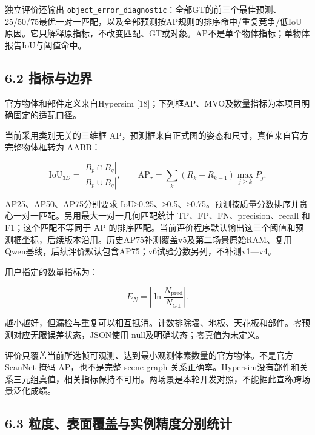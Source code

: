 \documentclass[UTF8,fontset=fandol]{ctexart}
\begin{document}
独立评价还输出 \texttt{object\_\allowbreak{}error\_\allowbreak{}diagnostic}：全部GT的前三个最佳预测、25/50/75最优一对一匹配，以及全部预测按AP规则的排序命中/重复竞争/低IoU原因。它只解释原指标，不改变匹配、GT或对象。AP不是单个物体指标；单物体报告IoU与阈值命中。



\subsection*{6.2 指标与边界}

官方物体和部件定义来自Hypersim [18]；下列框AP、MVO及数量指标为本项目明确固定的适配口径。



当前采用类别无关的三维框 AP，预测框来自正式图的姿态和尺寸，真值来自官方完整物体框转为 AABB：



\[
\mathrm{IoU}_{3D}=\frac{|B_p\cap B_g|}{|B_p\cup B_g|},\qquad
\mathrm{AP}_\tau=\sum_k(R_k-R_{k-1})\max_{j\ge k}P_j.
\]

AP25、AP50、AP75分别要求 IoU≥0.25、≥0.5、≥0.75。预测按质量分数排序并贪心一对一匹配。另用最大一对一几何匹配统计 TP、FP、FN、precision、recall 和 F1；这个匹配不等同于 AP 的排序匹配。当前评价程序默认输出这三个阈值和预测框坐标，后续版本沿用。历史AP75补测覆盖v5及第二场景原始RAM、复用Qwen基线，后续评价默认包含AP75；v6试验分数另列，不补测v1—v4。



用户指定的数量指标为：



\[
E_N=\left|\ln\frac{N_{\mathrm{pred}}}{N_{\mathrm{GT}}}\right|.
\]

越小越好，但漏检与重复可以相互抵消。计数排除墙、地板、天花板和部件。零预测对应无限误差状态，JSON使用 null及明确状态；零真值为未定义。



评价只覆盖当前所选帧可观测、达到最小观测体素数量的官方物体。不是官方 ScanNet 掩码 AP，也不是完整 scene graph 关系正确率。Hypersim没有部件和关系三元组真值，相关指标保持不可用。两场景是本轮开发对照，不能据此宣称跨场景泛化成绩。



\subsection*{6.3 粒度、表面覆盖与实例精度分别统计}
\end{document}

